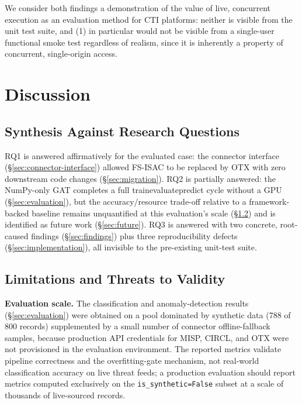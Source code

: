 \documentclass[conference]{IEEEtran}
\begin{document}
We consider both findings a demonstration of the value of live, concurrent execution as an evaluation method for CTI platforms: neither is visible from the unit test suite, and (1) in particular would not be visible from a single-user functional smoke test regardless of realism, since it is inherently a property of concurrent, single-origin access.

\section{Discussion}

\subsection{Synthesis Against Research Questions}
RQ1 is answered affirmatively for the evaluated case: the connector interface (\S\ref{sec:connector-interface}) allowed FS-ISAC to be replaced by OTX with zero downstream code changes (\S\ref{sec:migration}). RQ2 is partially answered: the NumPy-only GAT completes a full train\textendash evaluate\textendash predict cycle without a GPU (\S\ref{sec:evaluation}), but the accuracy/resource trade-off relative to a framework-backed baseline remains unquantified at this evaluation's scale (\S\ref{sec:threats}) and is identified as future work (\S\ref{sec:future}). RQ3 is answered with two concrete, root-caused findings (\S\ref{sec:findings}) plus three reproducibility defects (\S\ref{sec:implementation}), all invisible to the pre-existing unit-test suite.

\subsection{Limitations and Threats to Validity}
\label{sec:threats}

\textbf{Evaluation scale.} The classification and anomaly-detection results (\S\ref{sec:evaluation}) were obtained on a pool dominated by synthetic data (788 of 800 records) supplemented by a small number of connector offline-fallback samples, because production API credentials for MISP, CIRCL, and OTX were not provisioned in the evaluation environment. The reported metrics validate pipeline correctness and the overfitting-gate mechanism, not real-world classification accuracy on live threat feeds; a production evaluation should report metrics computed exclusively on the \texttt{is\_synthetic=False} subset at a scale of thousands of live-sourced records.
\end{document}
